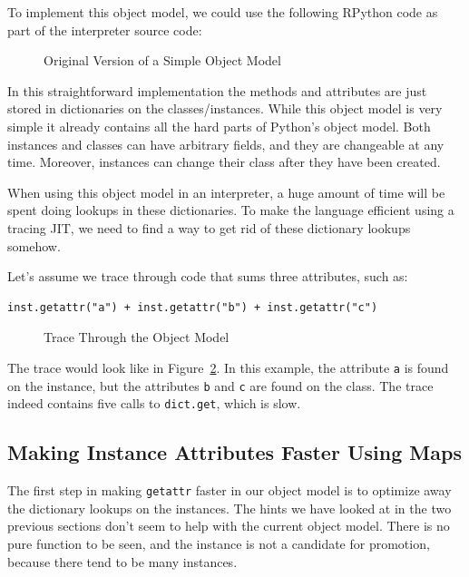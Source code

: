 \documentclass{sig-alternate}
\begin{document}
To implement this object model, we could use the following RPython code as part
of the interpreter source code:

\begin{figure}

\caption{Original Version of a Simple Object Model}
\label{fig:interpreter-slow}
\end{figure}


In this straightforward implementation the methods and attributes are just
stored in dictionaries on the classes/instances. While this object model is very
simple it already contains all the hard parts of Python's object model. Both
instances and classes can have arbitrary fields, and they are changeable at
any time.  Moreover, instances can change their class after they have been
created.

When using this object model in
an interpreter, a huge amount of time will be spent doing lookups in these
dictionaries. To make the language efficient using a tracing JIT, we need to
find a way to get rid of these dictionary lookups somehow.

Let's assume we trace through code that sums three attributes, such as:

\begin{Verbatim}
inst.getattr("a") + inst.getattr("b") + inst.getattr("c")
\end{Verbatim}

\begin{figure}

\caption{Trace Through the Object Model}
\label{fig:trace1}
\end{figure}

The trace would look like in Figure~\ref{fig:trace1}. In this example, the
attribute \texttt{a} is found on the instance, but the
attributes \texttt{b} and \texttt{c} are found on the class. The trace indeed contains
five calls to \texttt{dict.get}, which is slow.



\subsection{Making Instance Attributes Faster Using Maps}

The first step in making \texttt{getattr} faster in our object model is to optimize
away the dictionary lookups on the instances. The hints we have looked at in the
two previous sections don't seem to help with the current object model. There is
no pure function to be seen, and the instance is not a candidate for promotion,
because there tend to be many instances.
\end{document}
